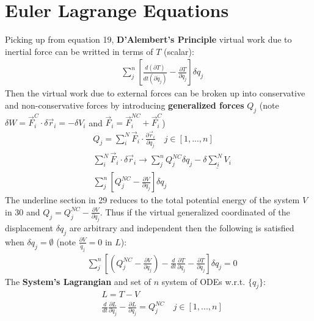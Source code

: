 \documentclass[conference]{IEEEtran}
\begin{document}
\section{Euler Lagrange Equations}
Picking up from equation 19, \textbf{D'Alembert's Principle} virtual work due to inertial force can be writted in terms of $T$ (scalar):
\begin{align}
    & \sum_j^n [\frac{d(\partial T)}{dt(\partial \dot{q}_j)} - \frac{\partial T}{\partial q_j}] \delta q_j
\end{align}
Then the virtual work due to external forces can be broken up into conservative and non-conservative forces by introducing \textbf{generalized forces} $Q_j$ (note $\delta W = \vec{F}_i^C \cdot \delta \vec{r}_i = -\delta V_i$ and $\vec{F}_i = \vec{F}_i^{NC} + \vec{F}_i^C$)
\begin{align}
    & Q_j = \sum_i^N \vec{F}_i \cdot \frac{\partial \vec{r}_i}{\partial q_j} \quad j \in [1, ..., n] \\
    & \sum_i^N \vec{F}_i \cdot \delta \vec{r}_i \to \sum_j^n Q_j^{NC} \delta q_j - \underline{\delta \sum_i^N V_i} \\
    & \sum_j^n[Q_j^{NC} - \frac{\partial V}{\partial q_j}]\delta q_j
\end{align}
The underline section in 29 reduces to the total potential energy of the system $V$ in 30 and $Q_j = Q_j^{NC} - \frac{\partial V}{\partial q_j}$. Thus if the virtual generalized coordinated of the displacement $\delta q_j$ are arbitrary and independent then the following is satisfied when $\delta q_j = \emptyset$ (note $\frac{\partial V}{\dot{q}_j} = 0$ in $L$):
\begin{align}
    & \sum_j^n [(Q_j^{NC} - \frac{\partial V}{\partial q_j}) - \frac{d}{dt}\frac{\partial T}{\partial \dot{q}_j} - \frac{\partial T}{\partial q_j}] \delta q_j = 0
\end{align}
The \textbf{System's Lagrangian} and set of $n$ system  of ODEs w.r.t. $\{q_j\}$:
\begin{align}
    & L = T - V \\
    & \frac{d}{dt}\frac{\partial L}{\partial \dot{q}_j} - \frac{\partial L}{\partial q_j} = Q_j^{NC} \quad j \in [1, ..., n]
\end{align}
\end{document}
